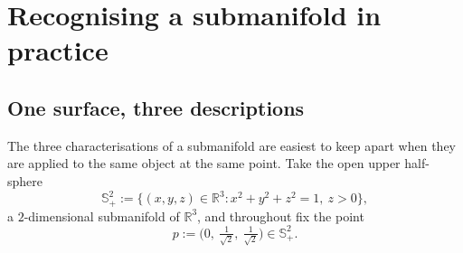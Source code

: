 
\section{Recognising a submanifold in practice}
\label{sec:recognising_submanifolds}


\subsection{One surface, three descriptions}

The three characterisations of a submanifold are easiest to keep apart when they are applied to
the same object at the same point. Take the open upper half-sphere
\[\mathbb{S}^2_+ := \{(x,y,z) \in \mathbb{R}^3 : x^2+y^2+z^2 = 1,\ z > 0\},\]
a $2$-dimensional submanifold of $\mathbb{R}^3$, and throughout fix the point
\[p := \Big(0,\ \tfrac{1}{\sqrt2},\ \tfrac{1}{\sqrt2}\Big) \in \mathbb{S}^2_+.\]

